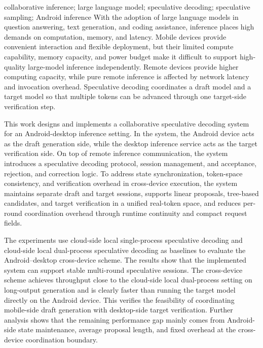 \begin{英文摘要}{collaborative inference; large language model; speculative decoding; speculative sampling; Android inference}
With the adoption of large language models in question answering, text generation, and coding assistance, inference places high demands on computation, memory, and latency. Mobile devices provide convenient interaction and flexible deployment, but their limited compute capability, memory capacity, and power budget make it difficult to support high-quality large-model inference independently. Remote devices provide higher computing capacity, while pure remote inference is affected by network latency and invocation overhead. Speculative decoding coordinates a draft model and a target model so that multiple tokens can be advanced through one target-side verification step.

This work designs and implements a collaborative speculative decoding system for an Android-desktop inference setting. In the system, the Android device acts as the draft generation side, while the desktop inference service acts as the target verification side. On top of remote inference communication, the system introduces a speculative decoding protocol, session management, and acceptance, rejection, and correction logic. To address state synchronization, token-space consistency, and verification overhead in cross-device execution, the system maintains separate draft and target sessions, supports linear proposals, tree-based candidates, and target verification in a unified real-token space, and reduces per-round coordination overhead through runtime continuity and compact request fields.

The experiments use cloud-side local single-process speculative decoding and cloud-side local dual-process speculative decoding as baselines to evaluate the Android--desktop cross-device scheme. The results show that the implemented system can support stable multi-round speculative sessions. The cross-device scheme achieves throughput close to the cloud-side local dual-process setting on long-output generation and is clearly faster than running the target model directly on the Android device. This verifies the feasibility of coordinating mobile-side draft generation with desktop-side target verification. Further analysis shows that the remaining performance gap mainly comes from Android-side state maintenance, average proposal length, and fixed overhead at the cross-device coordination boundary.
\end{英文摘要}
